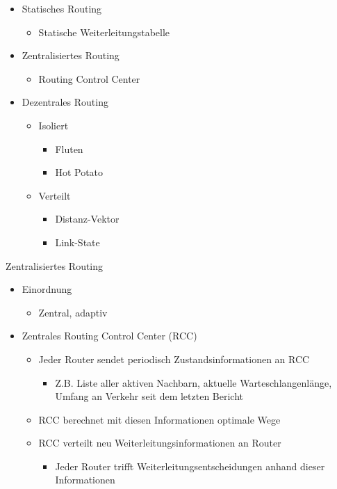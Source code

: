       \begin{itemize}
        \item Statisches Routing
          \begin{itemize}
            \item Statische Weiterleitungstabelle
          \end{itemize}
        \item Zentralisiertes Routing
          \begin{itemize}
            \item Routing Control Center
          \end{itemize}
        \item Dezentrales Routing
          \begin{itemize}
            \item Isoliert
              \begin{itemize}
                \item Fluten
                \item Hot Potato
              \end{itemize}
            \item Verteilt
              \begin{itemize}
                \item Distanz-Vektor
                \item Link-State
              \end{itemize}
          \end{itemize}
      \end{itemize}
      Zentralisiertes Routing
      \begin{itemize}
        \item Einordnung
          \begin{itemize}
            \item Zentral, adaptiv
          \end{itemize}
        \item Zentrales Routing Control Center (RCC)
          \begin{itemize}
            \item Jeder Router sendet periodisch Zustandsinformationen an RCC
              \begin{itemize}
                \item Z.B. Liste aller aktiven Nachbarn, aktuelle Warteschlangenlänge, Umfang an
                  Verkehr seit dem letzten Bericht
              \end{itemize}
            \item RCC berechnet mit diesen Informationen optimale Wege
            \item RCC verteilt neu Weiterleitungsinformationen an Router
              \begin{itemize}
                \item Jeder Router trifft Weiterleitungsentscheidungen anhand dieser Informationen
              \end{itemize}
          \end{itemize}
      \end{itemize}

